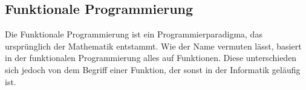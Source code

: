 

\subsection{Funktionale Programmierung}
Die Funktionale Programmierung ist ein Programmierparadigma, das ursprünglich der Mathematik entstammt. Wie der Name vermuten lässt, basiert in der funktionalen Programmierung alles auf Funktionen. Diese unterschieden sich jedoch von dem Begriff einer Funktion, der sonst in der Informatik geläufig ist.

